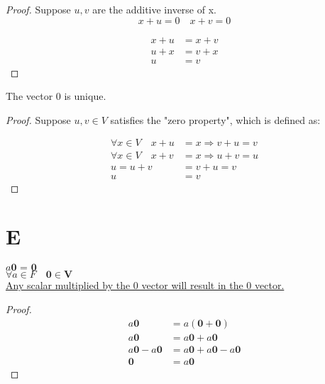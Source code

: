 \documentclass[11pt]{scrartcl}
\makeatletter
\newenvironment{Dequation}
  {%
  \def\tagform@##1{%
    \maketag@@@{\makebox[0pt][r]{(\ignorespaces##1\unskip\@@italiccorr)}}}%
  \ignorespaces
  }
  {%
  \def\tagform@##1{\maketag@@@{(\ignorespaces##1\unskip\@@italiccorr)}}%
  \ignorespacesafterend
  }
\makeatother
\begin{document}
\begin{proof}
Suppose $u,v$ are the additive inverse of x.
\[x + u = 0 \quad x + v = 0\]
\begin{Dequation}
\begin{align*}
	x + u & = x + v \tag{Transitive property}\\ 
	u + x & = v + x \tag{Commutative property}\\
	u & = v \tag{Theorem 1.1}
\end{align*}
\end{Dequation}
\end{proof}

\begin{corollary*}
	The vector $0$ is unique.
\end{corollary*}

\begin{proof}
Suppose $u,v \in V$ satisfies the "zero property", which is defined as:

\begin{Dequation}
\begin{align*}
	\forall x \in V \quad x + u & = x \Rightarrow v + u = v \\
	\forall x \in V \quad x + v & = x \Rightarrow u + v = u \\
	u = u + v & = v + u = v \tag{Transitive property}\\
	u & = v \tag{Theorem 1.1}
\end{align*}
\end{Dequation}
\end{proof}

\section{E}
\begin{theorem*}
			{$a\textbf{0 = 0}$ \\ $\forall a \in F \quad \textbf{0} \in \textbf{V}$ \\ \ul{Any scalar multiplied by the 0 vector will result in the 0 vector.}}
\end{theorem*}
\begin{proof}
\begin{Dequation}
\begin{align*}
	a \textbf{0} & = a(\textbf{0} + \textbf{0}) \tag{Identity element of addition} \\ 
	a \textbf{0} & = a\textbf{0} + a\textbf{0} \tag{Distributive} \\ 
	a \textbf{0} - a \textbf{0} & = a\textbf{0} + a\textbf{0} - a\textbf{0} \tag{Inverse element of addition} \\ 
	\textbf{0} & = a \textbf{0}
\end{align*}
\end{Dequation}
\end{proof}
\end{document}
